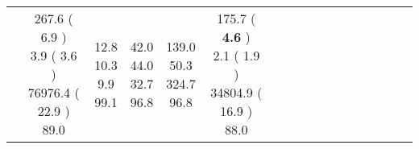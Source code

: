 \documentclass[9pt]{article}
\begin{document}
\begin{landscape}
\begin{longtable}{ l | c c c c | c c c c | c c c c | c c c c |}
 &
                    
                            \makecell{              267.6
     (             6.9
    ) \\
            {\footnotesize             3.9
     (              3.6
     )} \\
            {\footnotesize             76976.4
     (            22.9
    ) } \\
            {\small  \textcolor[rgb]{ 0.42 , 0.48 , 0.1} {89.0  }
} }


             &
                            \makecell{              12.8
     \\
            {\footnotesize             10.3
    } \\  {\footnotesize             9.9
     } \\
            {\small \textcolor[rgb]{ 0.218 , 0.682 , 0.1} {99.1  }
} }
             &                         \makecell{              42.0
     \\
            {\footnotesize             44.0
    } \\  {\footnotesize             32.7
     } \\
            {\small \textcolor[rgb]{ 0.264 , 0.636 , 0.1} {96.8  }
} }
             &
                            \makecell{              139.0
     \\
            {\footnotesize             50.3
    } \\  {\footnotesize             324.7
     } \\
            {\small \textcolor[rgb]{ 0.264 , 0.636 , 0.1} {96.8  }
} }
            

 & 
                            \makecell{              175.7
     (             \textbf{ 4.6 }
    ) \\
            {\footnotesize             2.1
     (              1.9
     )} \\
            {\footnotesize             34804.9
     (            16.9
    ) } \\
            {\small  \textcolor[rgb]{ 0.44 , 0.46 , 0.1} {88.0  }
} }



\end{longtable}
\end{landscape}
\end{document}
